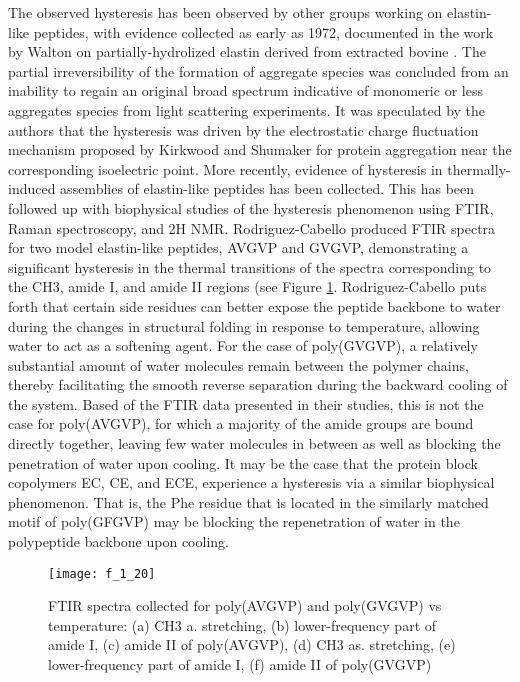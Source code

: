 \begin{refsection}
The observed hysteresis has been observed by other groups working on
elastin-like peptides, with evidence collected as early as 1972, documented in
the work by Walton on partially-hydrolized elastin derived from extracted bovine
.\cite{Jamieson1972a} The partial irreversibility of
the formation of aggregate species was concluded from an inability to regain an
original broad spectrum indicative of monomeric or less aggregates species from
light scattering experiments. It was speculated by the authors that the
hysteresis was driven by the electrostatic charge fluctuation mechanism proposed
by Kirkwood and Shumaker\cite{Kirkwood1952} for protein aggregation near the
corresponding isoelectric point. More recently, evidence of hysteresis in
thermally-induced assemblies of elastin-like peptides has been
collected.\cite{Osborne2008,Herrero-Vanrell2005} This has been followed up with
biophysical studies of the hysteresis phenomenon using FTIR, Raman spectroscopy,
and 2H NMR.\cite{Schmidt2005,Ma2012b} Rodriguez-Cabello produced FTIR spectra
for two model elastin-like peptides, AVGVP and GVGVP, demonstrating a
significant hysteresis in the thermal transitions of the spectra corresponding
to the CH3, amide I, and amide II regions (see Figure \ref{fig:lcst_cabello}.
Rodriguez-Cabello puts forth that certain side residues can better expose the
peptide backbone to water during the changes in structural folding in response
to temperature, allowing water to act as a softening agent. For the case of
poly(GVGVP), a relatively substantial amount of water molecules remain between
the polymer chains, thereby facilitating the smooth reverse separation during
the backward cooling of the system. Based of the FTIR data presented in their
studies, this is not the case for poly(AVGVP), for which a majority of the amide
groups are bound directly together, leaving few water molecules in between as
well as blocking the penetration of water upon cooling. It may be the case that
the protein block copolymers EC, CE, and ECE, experience a hysteresis via a
similar biophysical phenomenon. That is, the Phe residue that is located in the
similarly matched motif of poly(GFGVP) may be blocking the repenetration of
water in the polypeptide backbone upon cooling. 

\begin{figure}[h!] \centering \texttt{[image: f\_1\_20]}
    \caption[FTIR spectra collected for poly(AVGVP) and poly(GVGVP) vs
        temperature: (a) CH3 a. stretching, (b) lower-frequency part of amide I,
        (c) amide II of poly(AVGVP), (d) CH3 as. stretching, (e) lower-frequency
        part of amide I, (f) amide II of poly(GVGVP)]{FTIR spectra collected for
            poly(AVGVP) and poly(GVGVP) vs temperature: (a) CH3 a. stretching,
            (b) lower-frequency part of amide I, (c) amide II of poly(AVGVP),
            (d) CH3 as. stretching, (e) lower-frequency part of amide I, (f)
            amide II of poly(GVGVP)\cite{Schmidt2005}}\label{fig:lcst_cabello}
        \end{figure}



\end{refsection}
